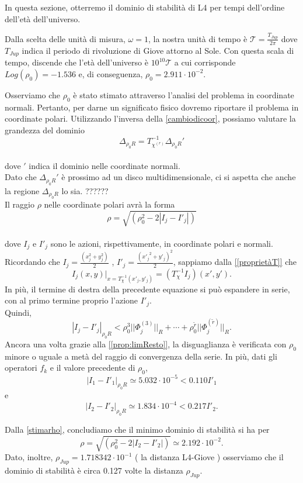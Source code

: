 \documentclass[a4paper,11pt,titlepage]{report}
\theoremstyle{definition}
\theoremstyle{plain}
\begin{document}
In questa sezione, otterremo il dominio di stabilità di L4 per tempi dell'ordine dell'età dell'universo.

Dalla scelta delle unità di misura, $\omega=1$, la nostra unità di tempo è $\mathcal{T} = \frac{T_{Jup}}{2\pi}$ dove $T_{Jup}$ indica il periodo di rivoluzione di Giove attorno al Sole.
Con questa scala di tempo, discende che l'età dell'universo è $10^{10} \mathcal{T} $ a cui corrisponde $Log(\rho_0) = -1.536$ e, di conseguenza, $\rho_0 = 2.911 \cdot 10^{-2}$.

Osserviamo che $\rho_0$ è stato stimato attraverso l'analisi del problema in coordinate normali. Pertanto, per darne un significato fisico dovremo riportare il problema in coordinate polari.
Utilizzando l'inversa della \ref{cambiodicoor}, possiamo valutare la grandezza del dominio $$ \varDelta_{ \rho_0 R} = T_{\chi^{(r)}}^{-1} \varDelta_{ \rho_0 R}'  $$ \\dove $'$ indica il dominio nelle coordinate normali.
\\Dato che $\varDelta_{ \rho_0 R}'$ è prossimo ad un disco multidimensionale, ci si aspetta che anche la regione $\varDelta_{ \rho_0 R}$ lo sia. ?????? %
 \\Il raggio $\rho$ nelle coordinate polari avrà la forma 
\begin{equation}
\label{stimarho}
\rho = \sqrt{( \rho_0^{2} - 2|I_j - I'_j| )}  
\end{equation}
\\dove $I_j$ e $I'_j$ sono le azioni, rispettivamente, in coordinate polari e normali.\\
Ricordando che $I_j = \frac{(x_j^2 + y_j^2)}{2}$ , $I'_j = \frac{({x'_j}^{2} + {y'_j})^{2}}{2}$, sappiamo dalla \ref{[proprietàT]} che $$I_j(x,y)|_{x=T_{\chi}^{-1} (x'_j, y'_j)} = (T_{\chi}^{-1}I_j)(x',y').$$
In più, il termine di destra della precedente equazione si può espandere in serie, con al primo termine proprio l'azione $I'_j$.
\\Quindi, $$ |I_j - I'_j|_{\rho_0 R} < {\rho_0^3 ||\varPhi_j^{(3)}||_R} + \cdots +{\rho_0^{\tilde{r}} ||\varPhi_j^{(\tilde{r})}||_R} .$$
Ancora una volta grazie alla \ref{[prop:limResto]}, la disguaglianza è verificata con $\rho_0$ minore o uguale a metà del raggio di convergenza della serie. In più, dati gli operatori $f_k$ e il valore precedente di $\rho_0$, $$|I_1-I'_1|_{\rho_0 R} \simeq 5.032 \cdot 10^{-5} < 0.110 I'_1 $$ e $$|I_2-I'_2|_{\rho_0 R} \simeq 1.834 \cdot 10^{-4} < 0.217 I'_2 .$$ 

Dalla \ref{stimarho}, concludiamo che il minimo dominio di stabilità si ha per $$\rho = \sqrt{( \rho_0^{2} - 2|I_2 - I'_2 |)} \simeq 2.192 \cdot 10^{-2} .$$
Dato, inoltre, $\rho_{Jup} = 1.718342 \cdot 10^{-1}$ ( la distanza L4-Giove ) osserviamo che il dominio di stabilità è circa 0.127 volte la distanza $\rho_{Jup}$.
\end{document}
